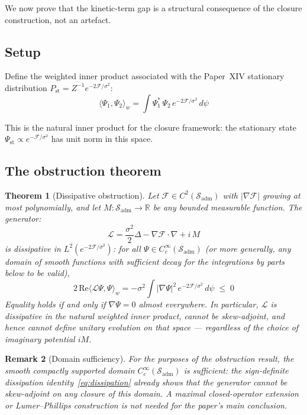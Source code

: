 \documentclass[12pt]{article}
\newtheorem{theorem}{Theorem}
\newtheorem{remark}[theorem]{Remark}
\newcommand{\Fcal}{\mathcal{F}}
\newcommand{\Lcal}{\mathcal{L}}
\newcommand{\Sadm}{\mathcal{S}_{\mathrm{adm}}}
\begin{document}
We now prove that the kinetic-term gap is a structural consequence of the closure construction, not an artefact.

\subsection{Setup}

Define the weighted inner product associated with the Paper~XIV stationary distribution $P_{\mathrm{st}} = Z^{-1}e^{-2\Fcal/\sigma^2}$:
\begin{equation}\label{eq:innerproduct}
    \langle \Psi_1, \Psi_2 \rangle_w = \int \Psi_1^*\, \Psi_2\, e^{-2\Fcal/\sigma^2}\, d\psi
\end{equation}

This is the natural inner product for the closure framework: the stationary state $\Psi_{\mathrm{st}} \propto e^{-\Fcal/\sigma^2}$ has unit norm in this space.

\subsection{The obstruction theorem}

\begin{theorem}[Dissipative obstruction]\label{thm:nogo}
Let $\Fcal \in C^2(\Sadm)$ with $|\nabla\Fcal|$ growing at most polynomially, and let $M: \Sadm \to \mathbb{R}$ be any bounded measurable function. The generator:
\begin{equation}
    \Lcal = \frac{\sigma^2}{2}\Delta - \nabla\Fcal\cdot\nabla + i\,M
\end{equation}
is dissipative in $L^2(e^{-2\Fcal/\sigma^2})$: for all $\Psi \in C_c^\infty(\Sadm)$ (or more generally, any domain of smooth functions with sufficient decay for the integrations by parts below to be valid),
\begin{equation}\label{eq:dissipation}
    2\,\mathrm{Re}\langle \Lcal\Psi, \Psi\rangle_w = -\sigma^2 \int |\nabla\Psi|^2\, e^{-2\Fcal/\sigma^2}\, d\psi \;\leq\; 0
\end{equation}
Equality holds if and only if $\nabla\Psi = 0$ almost everywhere. In particular, $\Lcal$ is dissipative in the natural weighted inner product, cannot be skew-adjoint, and hence cannot define unitary evolution on that space --- regardless of the choice of imaginary potential $iM$.
\end{theorem}

\begin{remark}[Domain sufficiency]
For the purposes of the obstruction result, the smooth compactly supported domain $C_c^\infty(\Sadm)$ is sufficient: the sign-definite dissipation identity~\eqref{eq:dissipation} already shows that the generator cannot be skew-adjoint on any closure of this domain. A maximal closed-operator extension or Lumer--Phillips construction is not needed for the paper's main conclusion.
\end{remark}
\end{document}
